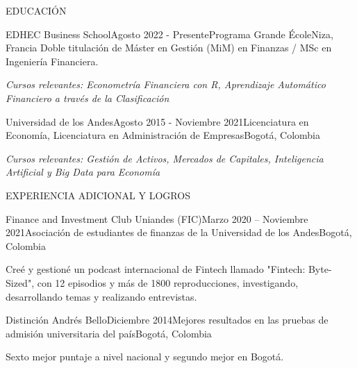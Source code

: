 \documentclass{resume} %
\begin{document}
\vspace{0.5em}

%
%

\begin{rSection}{EDUCACIÓN}

\vspace{0.3em}
\begin{rSubsection}{EDHEC Business School}{Agosto 2022 - Presente}{Programa Grande École}{Niza, Francia}
    Doble titulación de Máster en Gestión (MiM) en Finanzas / MSc en Ingeniería Financiera.
    \item \textit{Cursos relevantes: Econometría Financiera con R, Aprendizaje Automático Financiero a través de la Clasificación}
\end{rSubsection}

\begin{rSubsection}{Universidad de los Andes}{Agosto 2015 - Noviembre 2021}{Licenciatura en Economía, Licenciatura en Administración de Empresas}{Bogotá, Colombia}
    \item \textit{Cursos relevantes: Gestión de Activos, Mercados de Capitales, Inteligencia Artificial y Big Data para Economía}
\end{rSubsection}

\end{rSection}

\vspace{0.5em}


%
%

\begin{rSection}{EXPERIENCIA ADICIONAL Y LOGROS}

\vspace{0.3em}
\begin{rSubsection}{Finance and Investment Club Uniandes (FIC)}{Marzo 2020 – Noviembre 2021}{Asociación de estudiantes de finanzas de la Universidad de los Andes}{Bogotá, Colombia}
    \item Creé y gestioné un podcast internacional de Fintech llamado "Fintech: Byte-Sized", con 12 episodios y más de 1800 reproducciones, investigando, desarrollando temas y realizando entrevistas.
\end{rSubsection}

\begin{rSubsection}{Distinción Andrés Bello}{Diciembre 2014}{Mejores resultados en las pruebas de admisión universitaria del país}{Bogotá, Colombia}
    \item Sexto mejor puntaje a nivel nacional y segundo mejor en Bogotá.
\end{rSubsection}

\end{rSection}
\end{document}
